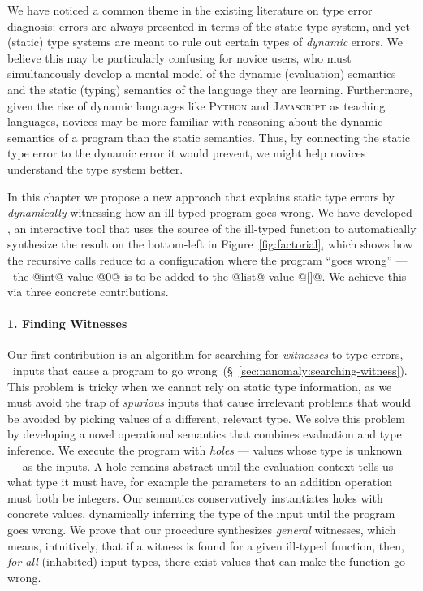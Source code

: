 We have noticed a common theme in the existing literature on type error
diagnosis: errors are always presented in terms of the static type
system, and yet (static) type systems are meant to rule out certain
types of \emph{dynamic} errors.
%
We believe this may be particularly confusing for novice users, who must
simultaneously develop a mental model of the dynamic (evaluation)
semantics and the static (typing) semantics of the language they are
learning.
%
Furthermore, given the rise of dynamic languages like \textsc{Python}
and \textsc{Javascript} as teaching languages, novices may be more
familiar with reasoning about the dynamic semantics of a program than
the static semantics.
%
Thus, by connecting the static type error to the dynamic error it
would prevent, we might help novices understand the type system better.

In this chapter we propose a new approach that explains static type
errors by \emph{dynamically} witnessing how an ill-typed program goes
wrong.
%
We have developed \toolname, an interactive tool that uses
the source of the ill-typed function to automatically synthesize
the result on the bottom-left in Figure~\ref{fig:factorial}, which
shows how the recursive calls reduce to a configuration where
the program ``goes wrong'' --- \ie\ the @int@ value @0@ is to be
added to the @list@ value @[]@.
We achieve this via three concrete contributions.

\paragraph{1. Finding Witnesses}
Our first contribution is an algorithm for searching for
\emph{witnesses} to type errors, \ie\ inputs that cause a
program to go wrong~(\S~\ref{sec:nanomaly:searching-witness}).
%
This problem is tricky when we cannot rely on
static type information, as we must avoid the
trap of \emph{spurious} inputs that cause
irrelevant problems that would be avoided
by picking values of a different, relevant type.
%
We solve this problem by developing a novel
operational semantics that combines evaluation
and type inference.
%
We execute the program with \emph{holes} --- values whose type is
unknown --- as the inputs.
%
A hole remains abstract until the evaluation
context tells us what type it must have, for
example the parameters to an addition operation
must both be integers.
%
Our semantics conservatively instantiates holes
with concrete values, dynamically inferring the
type of the input until the program goes wrong.
%
We prove that our procedure synthesizes \emph{general}
witnesses, which means, intuitively, that if a witness
is found for a given ill-typed function, then, \emph{for all}
(inhabited) input types, there exist values that can make
the function go wrong.

